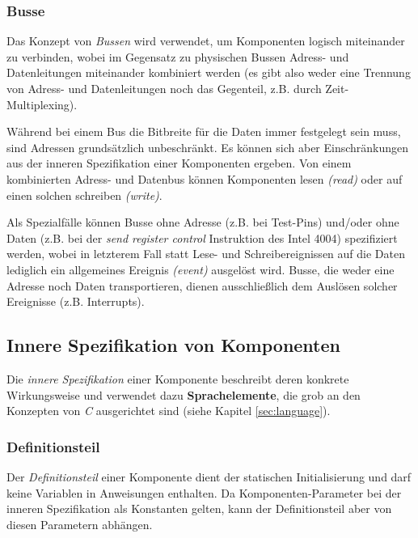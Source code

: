 \documentclass{scrartcl}
\begin{document}
\subsubsection{Busse}

\noindent Das Konzept von \textit{Bussen} wird verwendet, um Komponenten logisch miteinander zu verbinden, wobei im Gegensatz zu physischen Bussen Adress- und Datenleitungen miteinander kombiniert werden (es gibt also weder eine Trennung von Adress- und Datenleitungen noch das Gegenteil, z.B. durch Zeit-Multiplexing).

\vspace{10pt}
\noindent Während bei einem Bus die Bitbreite für die Daten immer festgelegt sein muss, sind Adressen grundsätzlich unbeschränkt. Es können sich aber Einschränkungen aus der inneren Spezifikation einer Komponenten ergeben. Von einem kombinierten Adress- und Datenbus können Komponenten lesen \textit{(read)} oder auf einen solchen schreiben \textit{(write)}.

\vspace{10pt}
\noindent Als Spezialfälle können Busse ohne Adresse (z.B. bei Test-Pins) und/oder ohne Daten (z.B. bei der \textit{send register control} Instruktion des Intel 4004) spezifiziert werden, wobei in letzterem Fall statt Lese- und Schreibereignissen auf die Daten lediglich ein allgemeines Ereignis \textit{(event)} ausgelöst wird. Busse, die weder eine Adresse noch Daten transportieren, dienen ausschließlich dem Auslösen solcher Ereignisse (z.B. Interrupts).

\subsection{Innere Spezifikation von Komponenten}

\noindent Die \textit{innere Spezifikation} einer Komponente beschreibt deren konkrete Wirkungsweise und verwendet dazu \textbf{Sprachelemente}, die grob an den Konzepten von \textit{C} ausgerichtet sind (siehe Kapitel \ref{sec:language}).

\subsubsection{Definitionsteil}

\noindent Der \textit{Definitionsteil} einer Komponente dient der statischen Initialisierung und darf keine Variablen in Anweisungen enthalten. Da Komponenten-Parameter bei der inneren Spezifikation als Konstanten gelten, kann der Definitionsteil aber von diesen Parametern abhängen.
\end{document}
